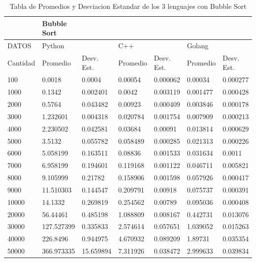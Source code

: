 \documentclass[12pt]{article} %
\begin{document}
\begin{table}[H]
    \def\arraystretch{1.3}
    \centering
    \begin{tabular}{|l|l|l|l|l|l|l|}
    \hline
        ~ & Bubble Sort & ~ & ~ & ~ & ~ & ~ \\ \hline
        DATOS & Python & ~ & C++ & ~ & Golang & ~ \\ \hline
        Cantidad & Promedio & Desv. Est. & Promedio & Desv. Est. & Promedio & Desv. Est. \\ \hline
        100 & 0.0018 & 0.0004 & 0.00054 & 0.000062 & 0.00034 & 0.000277 \\ \hline
        1000 & 0.1342 & 0.002401 & 0.0042 & 0.003119 & 0.001477 & 0.000428 \\ \hline
        2000 & 0.5764 & 0.043482 & 0.00923 & 0.000409 & 0.003846 & 0.000178 \\ \hline
        3000 & 1.232601 & 0.004318 & 0.020784 & 0.001754 & 0.007909 & 0.000213 \\ \hline
        4000 & 2.230502 & 0.042581 & 0.03684 & 0.00091 & 0.013814 & 0.000629 \\ \hline
        5000 & 3.5132 & 0.055782 & 0.058489 & 0.000285 & 0.021313 & 0.000226 \\ \hline
        6000 & 5.058199 & 0.163511 & 0.08836 & 0.001533 & 0.031634 & 0.0011 \\ \hline
        7000 & 6.958199 & 0.194601 & 0.119168 & 0.001122 & 0.046711 & 0.005821 \\ \hline
        8000 & 9.105999 & 0.21782 & 0.158906 & 0.001598 & 0.057926 & 0.000417 \\ \hline
        9000 & 11.510303 & 0.144547 & 0.209791 & 0.00918 & 0.075737 & 0.000391 \\ \hline
        10000 & 14.1332 & 0.269819 & 0.254562 & 0.00789 & 0.095036 & 0.000408 \\ \hline
        20000 & 56.44461 & 0.485198 & 1.088809 & 0.008167 & 0.442731 & 0.013076 \\ \hline
        30000 & 127.527399 & 0.335833 & 2.574614 & 0.057651 & 1.039052 & 0.015263 \\ \hline
        40000 & 226.8496 & 0.944975 & 4.670932 & 0.089209 & 1.89731 & 0.035354 \\ \hline
        50000 & 366.973335 & 15.659894 & 7.311926 & 0.038472 & 2.999633 & 0.039834 \\ \hline
    \end{tabular}
    \caption{Tabla de Promedios y Desviacion Estandar de los 3 lenguajes con Bubble Sort}
\end{table}
\end{document}
